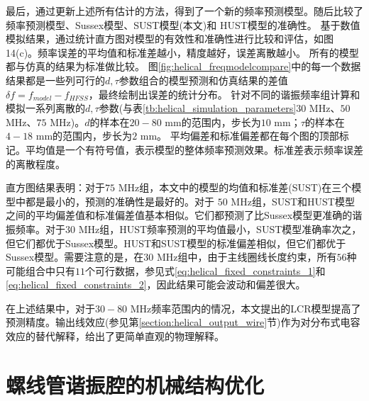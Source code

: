 最后，通过更新上述所有估计的方法，得到了一个新的频率预测模型。随后比较了频率预测模型、Sussex模型\cite[]{Siverns_Simkins_Weidt_Hensinger_2012}、SUST模型(本文)和 HUST模型\cite[]{Deng_Sun_Yuan_Xu_Zhang_Lu_Luo_2014}的准确性。
基于数值模拟结果，通过统计直方图对模型的有效性和准确性进行比较和评估，如图14(c)。频率误差的平均值和标准差越小，精度越好，误差离散越小。
所有的模型都与仿真的结果为标准做比较。
图\ref{fig:helical_freqmodelcompare}中的每一个数据结果都是一些列可行的$d,\tau$参数组合的模型预测和仿真结果的差值$\delta f=f_{model}-f_{HFSS}$，最终绘制出误差的统计分布。
针对不同的谐振频率组计算和模拟一系列离散的$d,\tau$参数(与表\ref{tb:helical_simulation_parameters}$30$ MHz、$50$ MHz、$75$ MHz)。$d$的样本在$20-80$ mm的范围内，步长为$10$ mm；$\tau$的样本在$4-18$ mm的范围内，步长为$2$ mm。
平均偏差和标准偏差都在每个图的顶部标记。平均值是一个有符号值，表示模型的整体频率预测效果。标准差表示频率误差的离散程度。

直方图结果表明：对于$75$ MHz组，本文中的模型的均值和标准差(SUST)在三个模型中都是最小的，预测的准确性是最好的。对于 $50$ MHz组，SUST和HUST模型之间的平均偏差值和标准偏差值基本相似。它们都预测了比Sussex模型更准确的谐振频率。对于$30$ MHz组，HUST频率预测的平均值最小，SUST模型准确率次之，但它们都优于Sussex模型。HUST和SUST模型的标准偏差相似，但它们都优于Sussex模型。需要注意的是，在$30$ MHz组中，由于主线圈线长度约束，所有$56$种可能组合中只有$11$个可行数据，参见式\eqref{eq:helical_fixed_constraints_1}和\eqref{eq:helical_fixed_constraints_2}，因此结果可能会波动和偏差很大。

在上述结果中，对于$30-80$ MHz频率范围内的情况，本文提出的LCR模型提高了预测精度。输出线效应(参见第\ref{section:helical_output_wire}节)作为对分布式电容效应的替代解释，给出了更简单直观的物理解释。

\section[螺线管谐振腔的机械结构优化]{螺线管谐振腔的机械结构优化}

